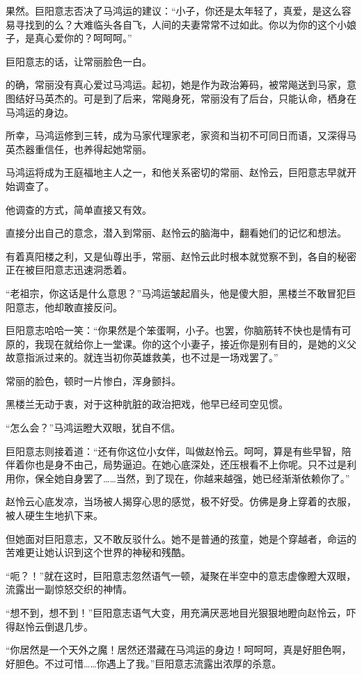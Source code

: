 \begin{this_body}
果然。巨阳意志否决了马鸿运的建议：“小子，你还是太年轻了，真爱，是这么容易寻找到的么？大难临头各自飞，人间的夫妻常常不过如此。你以为你的这个小娘子，是真心爱你的？呵呵呵。”

巨阳意志的话，让常丽脸色一白。

的确，常丽没有真心爱过马鸿运。起初，她是作为政治筹码，被常飚送到马家，意图结好马英杰的。可是到了后来，常飚身死，常丽没有了后台，只能认命，栖身在马鸿运的身边。

所幸，马鸿运修到三转，成为马家代理家老，家资和当初不可同日而语，又深得马英杰器重信任，也养得起她常丽。

马鸿运将成为王庭福地主人之一，和他关系密切的常丽、赵怜云，巨阳意志早就开始调查了。

他调查的方式，简单直接又有效。

直接分出自己的意念，潜入到常丽、赵怜云的脑海中，翻看她们的记忆和想法。

有着真阳楼之利，又是仙尊出手，常丽、赵怜云此时根本就觉察不到，各自的秘密正在被巨阳意志迅速洞悉着。

“老祖宗，你这话是什么意思？”马鸿运皱起眉头，他是傻大胆，黑楼兰不敢冒犯巨阳意志，他却敢直接反问。

巨阳意志哈哈一笑：“你果然是个笨蛋啊，小子。也罢，你脑筋转不快也是情有可原的，我现在就给你上一堂课。你的这个小妻子，接近你是别有目的，是她的义父故意指派过来的。就连当初你英雄救美，也不过是一场戏罢了。”

常丽的脸色，顿时一片惨白，浑身颤抖。

黑楼兰无动于衷，对于这种肮脏的政治把戏，他早已经司空见惯。

“怎么会？”马鸿运瞪大双眼，犹自不信。

巨阳意志则接着道：“还有你这位小女伴，叫做赵怜云。呵呵，算是有些早智，陪伴着你也是身不由己，局势逼迫。在她心底深处，还压根看不上你呢。只不过是利用你，保全她自身罢了……当然，到了现在，你越来越强，她已经渐渐依赖你了。”

赵怜云心底发凉，当场被人揭穿心思的感觉，极不好受。仿佛是身上穿着的衣服，被人硬生生地扒下来。

但她面对巨阳意志，又不敢反驳什么。她不是普通的孩童，她是个穿越者，命运的苦难更让她认识到这个世界的神秘和残酷。

“呃？！”就在这时，巨阳意志忽然语气一顿，凝聚在半空中的意志虚像瞪大双眼，流露出一副惊怒交织的神情。

“想不到，想不到！”巨阳意志语气大变，用充满厌恶地目光狠狠地瞪向赵怜云，吓得赵怜云倒退几步。

“你居然是一个天外之魔！居然还潜藏在马鸿运的身边！呵呵呵，真是好胆色啊，好胆色。不过可惜……你遇上了我。”巨阳意志流露出浓厚的杀意。


\end{this_body}
